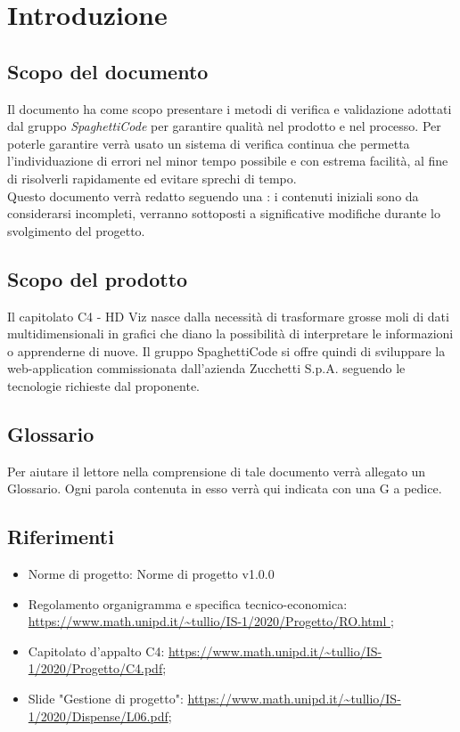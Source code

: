 \documentclass{article}
\begin{document}


\section{Introduzione}%
\label{sec:introduzione}

\subsection{Scopo del documento}%
\label{sub:scopo_del_documento}
Il documento ha come scopo presentare i metodi di verifica e validazione adottati dal gruppo \emph{SpaghettiCode} per garantire qualità nel prodotto e nel processo. Per poterle garantire verrà usato un sistema di verifica continua che permetta l'individuazione di errori nel minor tempo possibile e con estrema facilità, al fine di risolverli rapidamente ed evitare sprechi di tempo.\\
Questo documento verrà redatto seguendo una : i contenuti iniziali sono da considerarsi incompleti, verranno sottoposti a significative modifiche durante lo svolgimento del progetto. 

\subsection{Scopo del prodotto}%
\label{sub:scopo_prodotto}
Il capitolato C4 - HD Viz nasce dalla necessità di trasformare grosse moli di dati multidimensionali in grafici che diano la possibilità di interpretare le informazioni o apprenderne di nuove. Il gruppo SpaghettiCode si offre quindi di sviluppare la web-application commissionata dall’azienda Zucchetti S.p.A. seguendo le tecnologie richieste dal proponente. 


\subsection{Glossario}%
\label{sub:glossario}
Per aiutare il lettore nella comprensione di tale documento verrà allegato un Glossario. Ogni parola contenuta in esso verrà qui indicata con una G a pedice.


\subsection{Riferimenti}%
\label{sub:riferimenti}
\begin{itemize}
\item Norme di progetto: Norme di progetto v1.0.0
\item Regolamento organigramma e specifica tecnico-economica: \url{https://www.math.unipd.it/~tullio/IS-1/2020/Progetto/RO.html };
\item Capitolato d’appalto C4: \url{https://www.math.unipd.it/~tullio/IS-1/2020/Progetto/C4.pdf};
\item Slide "Gestione di progetto": \url{https://www.math.unipd.it/~tullio/IS-1/2020/Dispense/L06.pdf};
\end{itemize}
\end{document}
